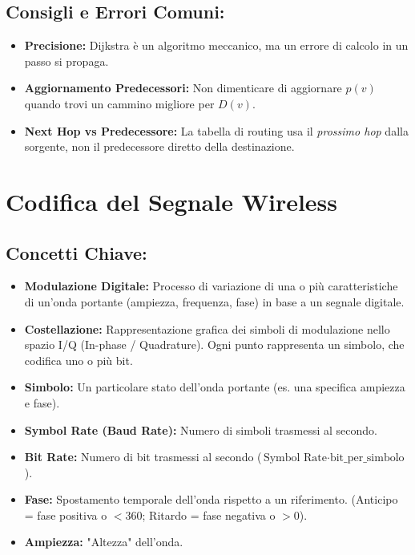 \subsection{Consigli e Errori Comuni:}
\begin{itemize}
    \item \textbf{Precisione:} Dijkstra è un algoritmo meccanico, ma un errore di calcolo in un passo si propaga.
    \item \textbf{Aggiornamento Predecessori:} Non dimenticare di aggiornare $p(v)$ quando trovi un cammino migliore per $D(v)$.
    \item \textbf{Next Hop vs Predecessore:} La tabella di routing usa il \textit{prossimo hop} dalla sorgente, non il predecessore diretto della destinazione.
\end{itemize}

\clearpage %

\section{Codifica del Segnale Wireless}

\subsection{Concetti Chiave:}
\begin{itemize}
    \item \textbf{Modulazione Digitale:} Processo di variazione di una o più caratteristiche di un'onda portante (ampiezza, frequenza, fase) in base a un segnale digitale.
    \item \textbf{Costellazione:} Rappresentazione grafica dei simboli di modulazione nello spazio I/Q (In-phase / Quadrature). Ogni punto rappresenta un simbolo, che codifica uno o più bit.
    \item \textbf{Simbolo:} Un particolare stato dell'onda portante (es. una specifica ampiezza e fase).
    \item \textbf{Symbol Rate (Baud Rate):} Numero di simboli trasmessi al secondo.
    \item \textbf{Bit Rate:} Numero di bit trasmessi al secondo ($\text{Symbol Rate} \cdot \text{bit\_per\_simbolo}$).
    \item \textbf{Fase:} Spostamento temporale dell'onda rispetto a un riferimento. (Anticipo = fase positiva o $<$360\textdegree; Ritardo = fase negativa o $>$0\textdegree).
    \item \textbf{Ampiezza:} "Altezza" dell'onda.
\end{itemize}

